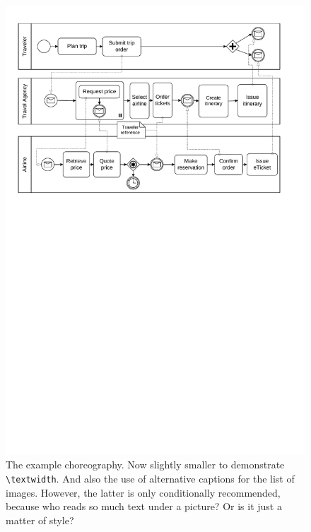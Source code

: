 \begin{figure}
  \centering
  \includegraphics[width=.8\textwidth]{figures/choreography.pdf}
  \caption[Example Choreography]{The example choreography. Now slightly smaller to demonstrate \texttt{\textbackslash textwidth}. And also the use of alternative captions for the list of images. However, the latter is only conditionally recommended, because who reads so much text under a picture? Or is it just a matter of style?}
  \label{fig:chor2}
\end{figure}


